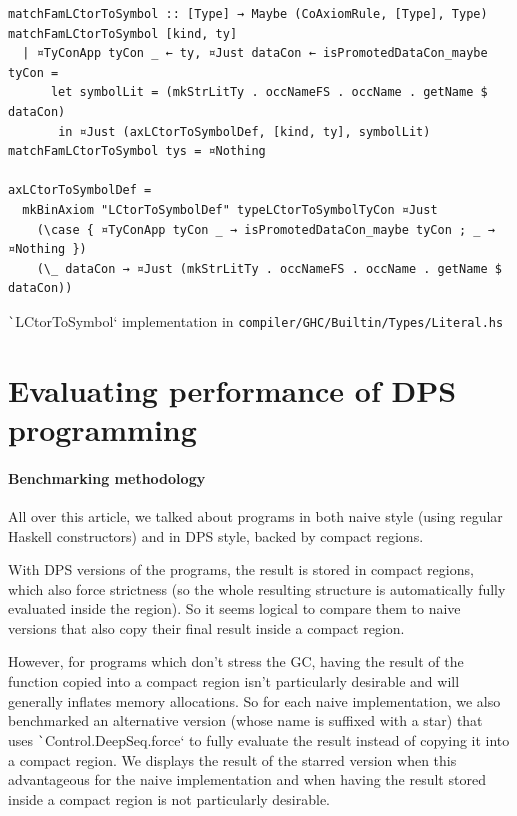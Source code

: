 \documentclass[english]{jflart}
\begin{document}
\begin{table}[p]
\small
\begin{verbatim}
matchFamLCtorToSymbol :: [Type] → Maybe (CoAxiomRule, [Type], Type)
matchFamLCtorToSymbol [kind, ty]
  | ¤TyConApp tyCon _ ← ty, ¤Just dataCon ← isPromotedDataCon_maybe tyCon =
      let symbolLit = (mkStrLitTy . occNameFS . occName . getName $ dataCon)
       in ¤Just (axLCtorToSymbolDef, [kind, ty], symbolLit)
matchFamLCtorToSymbol tys = ¤Nothing

axLCtorToSymbolDef =
  mkBinAxiom "LCtorToSymbolDef" typeLCtorToSymbolTyCon ¤Just
    (\case { ¤TyConApp tyCon _ → isPromotedDataCon_maybe tyCon ; _ → ¤Nothing })
    (\_ dataCon → ¤Just (mkStrLitTy . occNameFS . occName . getName $ dataCon))
\end{verbatim}
\caption{\texttt`LCtorToSymbol` implementation in \texttt{compiler/GHC/Builtin/Types/Literal.hs}}
\label{table:impl-LCtorToSymbol}
\end{table}

\section{Evaluating performance of DPS programming}\label{sec:benchmark}

\paragraph{Benchmarking methodology}

All over this article, we talked about programs in both naive style (using regular Haskell constructors) and in DPS style, backed by compact regions.

With DPS versions of the programs, the result is stored in compact regions, which also force strictness (so the whole resulting structure is automatically fully evaluated inside the region). So it seems logical to compare them to naive versions that also copy their final result inside a compact region.

However, for programs which don't stress the GC, having the result of the function copied into a compact region isn't particularly desirable and will generally inflates memory allocations. So for each naive implementation, we also benchmarked an alternative version (whose name is suffixed with a star) that uses \texttt`Control.DeepSeq.force` to fully evaluate the result instead of copying it into a compact region. We displays the result of the starred version when this advantageous for the naive implementation and when having the result stored inside a compact region is not particularly desirable.
\end{document}
